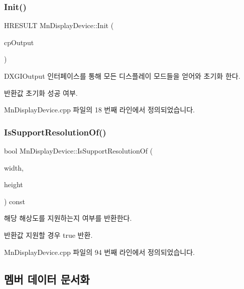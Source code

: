 \subsubsection{\texorpdfstring{Init()}{Init()}}
{\footnotesize\ttfamily H\+R\+E\+S\+U\+LT Mn\+Display\+Device\+::\+Init (\begin{DoxyParamCaption}\item[{\hyperlink{namespace_m_n_l_ac03add2215d9e5f2938af7887c5b09de}{C\+P\+D\+X\+G\+I\+Output}}]{cp\+Output }\end{DoxyParamCaption})}



D\+X\+G\+I\+Output 인터페이스를 통해 모든 디스플레이 모드들을 얻어와 초기화 한다. 

\begin{DoxyReturn}{반환값}
초기화 성공 여부. 
\end{DoxyReturn}


Mn\+Display\+Device.\+cpp 파일의 18 번째 라인에서 정의되었습니다.

\mbox{\label{class_m_n_l_1_1_mn_display_device_a4180fb0187da5e3751bca74fb46880a3}} 
\subsubsection{\texorpdfstring{Is\+Support\+Resolution\+Of()}{IsSupportResolutionOf()}}
{\footnotesize\ttfamily bool Mn\+Display\+Device\+::\+Is\+Support\+Resolution\+Of (\begin{DoxyParamCaption}\item[{U\+I\+NT}]{width,  }\item[{U\+I\+NT}]{height }\end{DoxyParamCaption}) const}



해당 해상도를 지원하는지 여부를 반환한다. 

\begin{DoxyReturn}{반환값}
지원할 경우 true 반환. 
\end{DoxyReturn}


Mn\+Display\+Device.\+cpp 파일의 94 번째 라인에서 정의되었습니다.



\subsection{멤버 데이터 문서화}
\mbox{\label{class_m_n_l_1_1_mn_display_device_a718cf72ca95ace1f6dcc4d31daea6be9}} 
